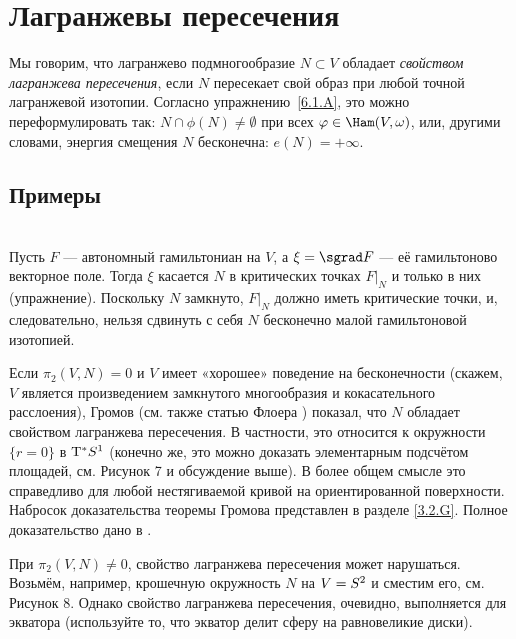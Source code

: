 \section{Лагранжевы пересечения}

Мы говорим, что лагранжево подмногообразие $N \subset V$ обладает \emph{свойством лагранжева пересечения}, если $N$ пересекает свой образ при любой точной лагранжевой изотопии.
Согласно упражнению~\ref{6.1.A}, это можно переформулировать так: $N \cap \phi (N) \ne \emptyset$ при всех $\phi \in \Ham (V, \omega)$, или, другими словами, энергия смещения $N$ бесконечна: $e (N) = + \infty$.

\subsection*{Примеры} 

\begin{ex}{}\\
Пусть $F$ — автономный гамильтониан на $V$, а $\xi = \sgrad F$ — её гамильтоново
векторное поле. 
Тогда $\xi$ касается $N$ в критических точках $F|_N$ и только в них
(упражнение). 
Поскольку $N$ замкнуто, $F|_N$ должно иметь критические точки, и,
следовательно, нельзя сдвинуть с себя $N$ бесконечно малой
гамильтоновой изотопией. 
\end{ex}

\begin{ex}{}\label{6.2.B}
Если $\pi_2 (V, N) = 0$ и $V$ имеет «хорошее» поведение на
бесконечности (скажем, $V$ является произведением замкнутого
многообразия и кокасательного расслоения), Громов \cite{G1} (см. также
статью Флоера \cite{F}) показал, что $N$ обладает свойством лагранжева
пересечения. 
В частности, это относится к окружности $\{r = 0\}$ в $\mathrm{T}^\ast S^1$
(конечно же, это можно доказать элементарным подсчётом площадей,
см. Рисунок 7 и обсуждение выше). 
В более общем смысле это справедливо для любой нестягиваемой кривой на
ориентированной поверхности. 
Набросок доказательства теоремы Громова представлен в разделе \ref{3.2.G}.
Полное доказательство дано в \cite[Chap. X]{AL}. 

При $\pi_2 (V, N) \ne 0$, свойство лагранжева пересечения может нарушаться.
Возьмём, например, крошечную окружность $N$ на $V \z= S^2$ и сместим его, см. Рисунок 8.
Однако свойство лагранжева пересечения, очевидно, выполняется для экватора (используйте то, что экватор делит сферу на равновеликие диски).
\end{ex}




